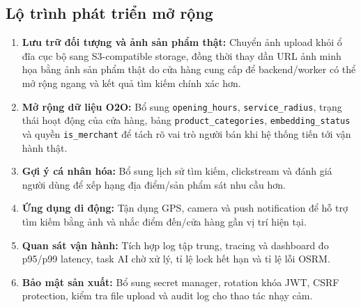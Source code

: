\documentclass[12pt, a4paper]{article}
\begin{document}
\subsection{Lộ trình phát triển mở rộng}
\begin{enumerate}
    \item \textbf{Lưu trữ đối tượng và ảnh sản phẩm thật:} Chuyển ảnh upload khỏi ổ đĩa cục bộ sang S3-compatible storage, đồng thời thay dần URL ảnh minh họa bằng ảnh sản phẩm thật do cửa hàng cung cấp để backend/worker có thể mở rộng ngang và kết quả tìm kiếm chính xác hơn.

    \item \textbf{Mở rộng dữ liệu O2O:} Bổ sung \texttt{opening\_hours}, \texttt{service\_radius}, trạng thái hoạt động của cửa hàng, bảng \texttt{product\_categories}, \texttt{embedding\_status} và quyền \texttt{is\_merchant} để tách rõ vai trò người bán khi hệ thống tiến tới vận hành thật.
    
    \item \textbf{Gợi ý cá nhân hóa:} Bổ sung lịch sử tìm kiếm, clickstream và đánh giá người dùng để xếp hạng địa điểm/sản phẩm sát nhu cầu hơn.
    
    \item \textbf{Ứng dụng di động:} Tận dụng GPS, camera và push notification để hỗ trợ tìm kiếm bằng ảnh và nhắc điểm đến/cửa hàng gần vị trí hiện tại.

    \item \textbf{Quan sát vận hành:} Tích hợp log tập trung, tracing và dashboard đo p95/p99 latency, task AI chờ xử lý, tỉ lệ lock hết hạn và tỉ lệ lỗi OSRM.

    \item \textbf{Bảo mật sản xuất:} Bổ sung secret manager, rotation khóa JWT, CSRF protection, kiểm tra file upload và audit log cho thao tác nhạy cảm.
\end{enumerate}

\clearpage
\end{document}
